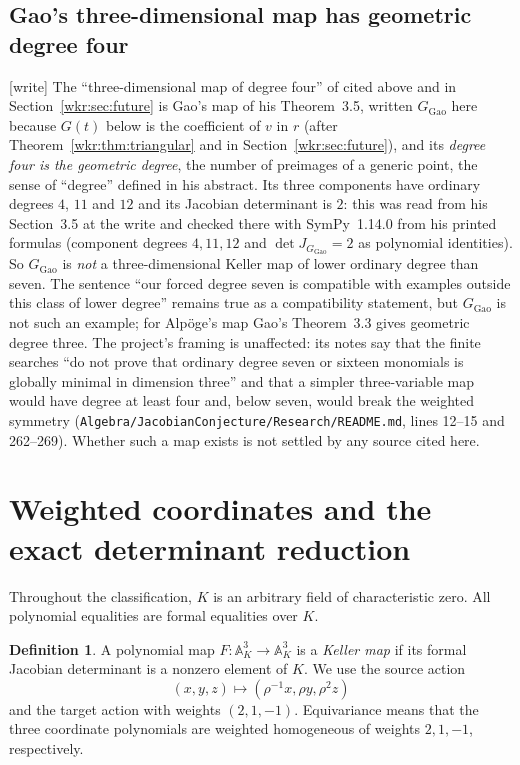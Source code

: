 \documentclass[11pt,a4paper]{article}
\numberwithin{equation}{section}
\theoremstyle{definition}
\newtheorem{definition}[theorem]{Definition}
\theoremstyle{remark}
\newcommand{\A}{\mathbb{A}}
\newcommand{\wtag}{\textup{[write]}}%
\newcommand{\rpath}[1]{\nolinkurl{#1}}
\begin{document}
\subsection{Gao's three-dimensional map has geometric degree four}\label{wkr:sub:gao}
\wtag{} The ``three-dimensional map of degree four'' of \cite{gao} cited
above and in Section~\ref{wkr:sec:future} is Gao's map of his
Theorem~3.5, written $G_{\mathrm{Gao}}$ here because $G(t)$ below is the
coefficient of $v$ in $r$ (after Theorem~\ref{wkr:thm:triangular} and in
Section~\ref{wkr:sec:future}), and its \emph{degree four is the geometric degree}, the
number of preimages of a generic point, the sense of ``degree'' defined
in his abstract. Its three components have ordinary degrees $4$, $11$ and
$12$ and its Jacobian determinant is $2$: this was read from his
Section~3.5 at the write and checked there with SymPy~1.14.0 from his
printed formulas (component degrees $4,11,12$ and $\det J_{G_{\mathrm{Gao}}}=2$ as
polynomial identities). So $G_{\mathrm{Gao}}$ is \emph{not} a three-dimensional Keller
map of lower ordinary degree than seven. The sentence ``our forced degree
seven is compatible with examples outside this class of lower degree''
remains true as a compatibility statement, but $G_{\mathrm{Gao}}$ is not such an example;
for Alp\"oge's map Gao's Theorem~3.3 gives geometric degree three. The
project's framing is unaffected: its notes say that the finite searches
``do not prove that ordinary degree seven or sixteen monomials is globally
minimal in dimension three'' and that a simpler three-variable map would
have degree at least four and, below seven, would break the weighted
symmetry (\rpath{Algebra/JacobianConjecture/Research/README.md}, lines
12--15 and 262--269). Whether such a map exists is not settled by any
source cited here.

\section{Weighted coordinates and the exact determinant reduction}
\label{wkr:sec:coordinates}

Throughout the classification, $K$ is an arbitrary field of characteristic
zero. All polynomial equalities are formal equalities over $K$.

\begin{definition}
A polynomial map $F:\A^3_K\to\A^3_K$ is a \emph{Keller map} if its formal
Jacobian determinant is a nonzero element of $K$. We use the source action
\[
(x,y,z)\longmapsto(\rho^{-1}x,\rho y,\rho^2z)
\]
and the target action with weights $(2,1,-1)$. Equivariance means that the
three coordinate polynomials are weighted homogeneous of weights $2,1,-1$,
respectively.
\end{definition}
\end{document}
